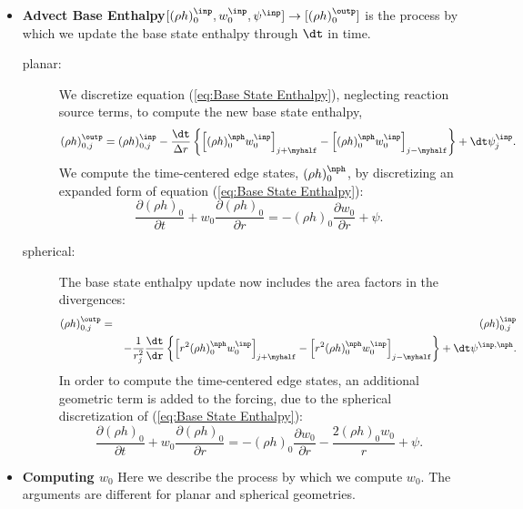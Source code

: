 \begin{itemize}
\item {\bf Advect Base Enthalpy}$[(\rho h)_0^\inp,w_0^\inp,\psi^\inp] \rightarrow [(\rho h)_0^\outp]$
  is the process by which we update the base state enthalpy through $\dt$ in time.  
\begin{description}
\item[planar:] We discretize equation (\ref{eq:Base State Enthalpy}), neglecting reaction source terms,
  to compute the new base state enthalpy,
\begin{equation}
(\rho h)_{0,j}^{\outp} = (\rho h)_{0,j}^{\inp} - \frac{\dt}{\Delta r} \left\{ \left[ (\rho h)_0^{\nph} w_0^{\inp}\right]_{j+\myhalf} - \left[ (\rho h)_0^{\nph} w_0^{\inp}\right]_{j-\myhalf} \right\} + \dt\psi_j^{\inp}.
\end{equation}
  We compute the time-centered edge states, $(\rho h)_0^{\nph}$, by discretizing
  an expanded form of equation (\ref{eq:Base State Enthalpy}):
\begin{equation}
\frac{\partial (\rho h)_0}{\partial t} + w_0 \frac{\partial (\rho h)_0}{\partial r} = -(\rho h)_0 \frac{\partial w_0}{\partial r} + \psi.
\end{equation}
\item[spherical:]  The base state enthalpy update now includes the area factors 
  in the divergences:
\begin{eqnarray}
(\rho h)_{0,j}^{\outp} &=& (\rho h)_{0,j}^{\inp} \nonumber \\
&& - \frac{1}{r_j^2} \frac{\dt}{\dr} \left \{ \left[ r^2 (\rho h)_0^{\nph} w_0^{\inp}\right]_{j+\myhalf} - \left[ r^2 (\rho h)_0^{\nph} w_0^{\inp}\right]_{j-\myhalf} \right\} +\dt\psi^{\inp,\nph}.\nonumber\\
\end{eqnarray}
  In order to compute the time-centered edge states, an additional geometric 
  term is added to the forcing, due to the spherical discretization of 
  (\ref{eq:Base State Enthalpy}):
\begin{equation}
\frac{\partial (\rho h)_0}{\partial t} + w_0 \frac{\partial (\rho h)_0}{\partial r} = -(\rho h)_0 \frac{\partial w_0}{\partial r} - \frac{2 (\rho h)_0 w_0}{r} + \psi.
\end{equation}
\end{description}

\item {\bf Computing {\boldmath $w_0$}}\label{Sec:Computing w0}
Here we describe the process by which we compute $w_0$.  The arguments 
are different for planar and spherical geometries.
\begin{description}


\end{description}
\end{itemize}
